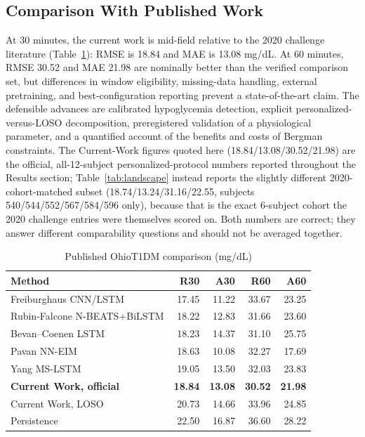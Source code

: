 \documentclass[journal]{IEEEtran}
\begin{document}
\subsection{Comparison With Published Work}

At 30 minutes, the current work is mid-field relative to the 2020 challenge literature \cite{ref60,ref61,ref62,ref63,ref64} (Table~\ref{tab:published}): RMSE is 18.84 and MAE is 13.08 mg/dL. At 60 minutes, RMSE 30.52 and MAE 21.98 are nominally better than the verified comparison set, but differences in window eligibility, missing-data handling, external pretraining, and best-configuration reporting prevent a state-of-the-art claim. The defensible advances are calibrated hypoglycemia detection, explicit personalized-versus-LOSO decomposition, preregistered validation of a physiological parameter, and a quantified account of the benefits and costs of Bergman constraints. The Current-Work figures quoted here (18.84/13.08/30.52/21.98) are the official, all-12-subject personalized-protocol numbers reported throughout the Results section; Table~\ref{tab:landscape} instead reports the slightly different 2020-cohort-matched subset (18.74/13.24/31.16/22.55, subjects 540/544/552/567/584/596 only), because that is the exact 6-subject cohort the 2020 challenge entries were themselves scored on. Both numbers are correct; they answer different comparability questions and should not be averaged together.

\begin{table}[t]
\centering
\caption{Published OhioT1DM comparison (mg/dL)}
\label{tab:published}
\footnotesize
\begin{tabular}{lrrrr}
\toprule
Method & R30 & A30 & R60 & A60 \\
\midrule
Freiburghaus CNN/LSTM \cite{ref63} & 17.45 & 11.22 & 33.67 & 23.25 \\
Rubin-Falcone N-BEATS+BiLSTM \cite{ref62} & 18.22 & 12.83 & 31.66 & 23.60 \\
Bevan--Coenen LSTM \cite{ref61} & 18.23 & 14.37 & 31.10 & 25.75 \\
Pavan NN-EIM \cite{ref60} & 18.63 & 10.08 & 32.27 & 17.69 \\
Yang MS-LSTM \cite{ref64} & 19.05 & 13.50 & 32.03 & 23.83 \\
\textbf{Current Work, official} & \textbf{18.84} & \textbf{13.08} & \textbf{30.52} & \textbf{21.98} \\
Current Work, LOSO & 20.73 & 14.66 & 33.96 & 24.85 \\
Persistence & 22.50 & 16.87 & 36.60 & 28.22 \\
\bottomrule
\end{tabular}
\end{table}
\end{document}

